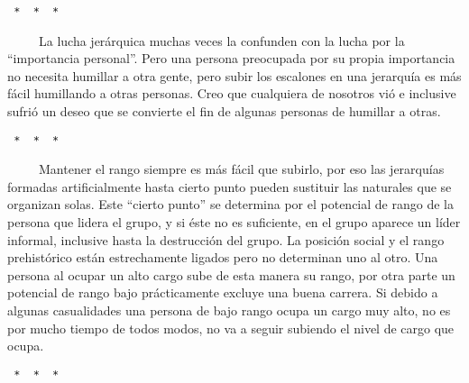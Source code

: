 \begin{verbatim}
 *  *  * 
\end{verbatim}

~ ~ ~ La lucha jerárquica muchas veces la confunden con la lucha por la
``importancia personal''. Pero una persona preocupada por su propia
importancia no necesita humillar a otra gente, pero subir los escalones
en una jerarquía es más fácil humillando a otras personas. Creo que
cualquiera de nosotros vió e inclusive sufrió un deseo que se convierte
el fin de algunas personas de humillar a otras.

\begin{verbatim}
 *  *  * 
\end{verbatim}

~ ~ ~ Mantener el rango siempre es más fácil que subirlo, por eso las
jerarquías formadas artificialmente hasta cierto punto pueden sustituir
las naturales que se organizan solas. Este ``cierto punto'' se determina
por el potencial de rango de la persona que lidera el grupo, y si éste
no es suficiente, en el grupo aparece un líder informal, inclusive hasta
la destrucción del grupo. La posición social y el rango prehistórico
están estrechamente ligados pero no determinan uno al otro. Una persona
al ocupar un alto cargo sube de esta manera su rango, por otra parte un
potencial de rango bajo prácticamente excluye una buena carrera. Si
debido a algunas casualidades una persona de bajo rango ocupa un cargo
muy alto, no es por mucho tiempo de todos modos, no va a seguir subiendo
el nivel de cargo que ocupa.

\begin{verbatim}
 *  *  * 
\end{verbatim}

